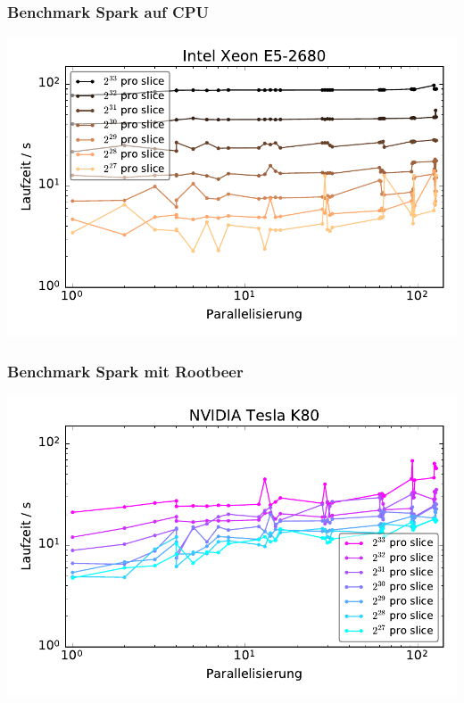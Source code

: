 

\begin{frame}
    \frametitle{Benchmark Spark auf CPU}
    \centerline{\includegraphics[width=0.9\linewidth]{cluster-strong-scaling-cpu.pdf}}
\end{frame}


\begin{frame}
    \frametitle{Benchmark Spark mit Rootbeer}
    \centerline{\includegraphics[width=0.9\linewidth]{cluster-strong-scaling-gpu.pdf}}
\end{frame}



